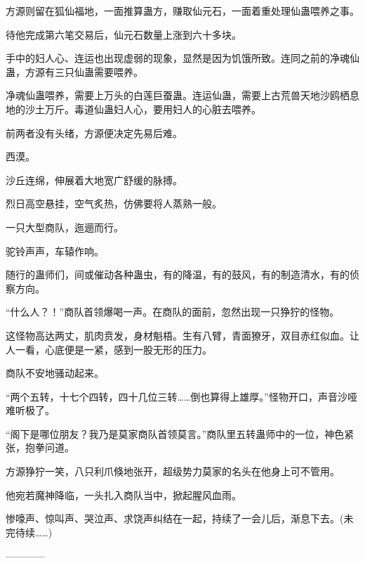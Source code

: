 \begin{this_body}
方源则留在狐仙福地，一面推算蛊方，赚取仙元石，一面着重处理仙蛊喂养之事。

待他完成第六笔交易后，仙元石数量上涨到六十多块。

手中的妇人心、连运也出现虚弱的现象，显然是因为饥饿所致。连同之前的净魂仙蛊，方源有三只仙蛊需要喂养。

净魂仙蛊喂养，需要上万头的白莲巨蚕蛊。连运仙蛊，需要上古荒兽天地沙鸥栖息地的沙土万斤。毒道仙蛊妇人心，要用妇人的心脏去喂养。

前两者没有头绪，方源便决定先易后难。

西漠。

沙丘连绵，伸展着大地宽广舒缓的脉搏。

烈日高空悬挂，空气炙热，仿佛要将人蒸熟一般。

一只大型商队，迤逦而行。

驼铃声声，车辕作响。

随行的蛊师们，间或催动各种蛊虫，有的降温，有的鼓风，有的制造清水，有的侦察方向。

“什么人？！”商队首领爆喝一声。在商队的面前，忽然出现一只狰狞的怪物。

这怪物高达两丈，肌肉贲发，身材魁梧。生有八臂，青面獠牙，双目赤红似血。让人一看，心底便是一紧，感到一股无形的压力。

商队不安地骚动起来。

“两个五转，十七个四转，四十几位三转……倒也算得上雄厚。”怪物开口，声音沙哑难听极了。

“阁下是哪位朋友？我乃是莫家商队首领莫言。”商队里五转蛊师中的一位，神色紧张，抱拳问道。

方源狰狞一笑，八只利爪倏地张开，超级势力莫家的名头在他身上可不管用。

他宛若魔神降临，一头扎入商队当中，掀起腥风血雨。

惨嚎声、惊叫声、哭泣声、求饶声纠结在一起，持续了一会儿后，渐息下去。(未完待续……)

------------

\end{this_body}

